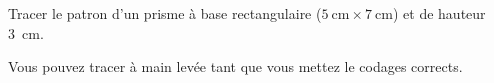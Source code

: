 
\begin{exercice}\label{exo2smath-0317}

    Tracer le patron d'un prisme à base rectangulaire ($\SI{5}{\centi\meter}\times \SI{7}{\centi\meter}$) et de hauteur \SI{3}{\centi\meter}.

    Vous pouvez tracer à main levée tant que vous mettez le codages corrects.

\end{exercice}
